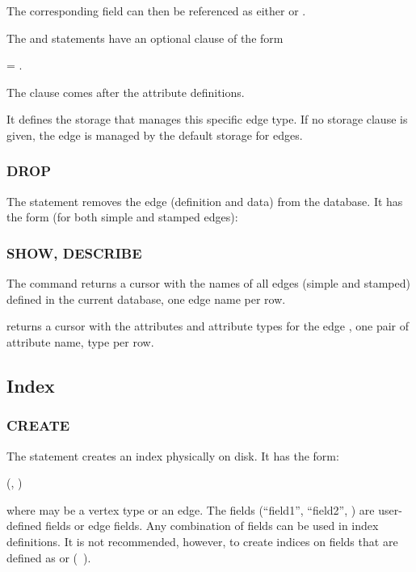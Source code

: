    

The corresponding field can then be referenced as either
 or .

The  and 
statements have an optional
 clause of the form

 = .

The  clause comes after the attribute definitions.

It defines the storage
that manages this specific edge type.
If no storage clause is given, the edge
is managed by the default storage for edges.

\subsubsection{DROP}
The  statement removes the edge
(definition and data)
from the database.
It has the form (for both simple and stamped edges):

 

\subsubsection{SHOW, DESCRIBE}
The command 
returns a cursor with the names of all
edges (simple and stamped)
defined in the current database,
one edge name per row.

 
returns a cursor with the attributes
and attribute types for the edge 
, one pair of
attribute name, type per row.

\subsection{Index}
\subsubsection{CREATE}
The  statement
creates an index physically on disk.
It has the form:

   
(, )

where  may be a vertex type or an edge.
The fields (``field1'', ``field2'', \etc)
are user-defined fields or edge fields.
Any combination of fields
can be used in index definitions.
It is not recommended, however,
to create indices on fields that are defined as 
or  (\eg\ ).


